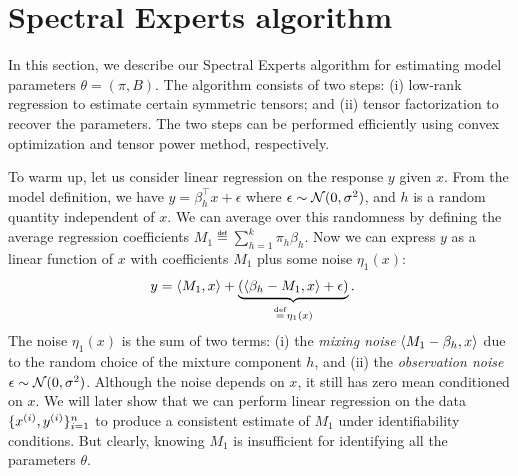 \section{Spectral Experts algorithm}
\label{sec:algo}

In this section, we describe our Spectral Experts algorithm
for estimating model parameters $\theta = (\pi, B)$.
The algorithm consists of two steps:
(i) low-rank regression to estimate certain symmetric tensors;
and (ii) tensor factorization to recover the parameters.
The two steps can be performed efficiently using
convex optimization and tensor power method, respectively.

To warm up, let us consider linear regression
on the response $y$ given $x$.
From the model definition, we have $y = \beta_h^\top x + \epsilon$ where
$\epsilon \sim \mathcal{N}(0, \sigma^2)$, and $h$ is a random quantity
independent of $x$.
We can average over this randomness by defining
the average regression coefficients
$M_1 \eqdef \sum_{h=1}^k \pi_h \beta_h$.
Now we can express $y$ as a linear function of $x$ with coefficients $M_1$
plus some noise $\eta_1(x)$:
\begin{align}
  y &= \langle M_1, x \rangle +
  \underbrace{(\langle \beta_h - M_1, x \rangle + \epsilon)}_{\stackrel{\rm def}{=} \eta_1(x)}. \label{eqn:y1}
\end{align}
The noise $\eta_1(x)$ is the sum of two terms:
(i) the \emph{mixing noise} $\langle M_1 - \beta_h, x \rangle$
due to the random choice of the mixture component $h$,
and (ii) the \emph{observation noise} $\epsilon \sim \mathcal{N}(0, \sigma^2)$.
Although the noise depends on $x$,
it still has zero mean conditioned on $x$.
We will later show that we can
perform linear regression on the data $\{x^{(i)},
y^{(i)}\}_{i=1}^{n}$ to produce a consistent estimate of $M_1$
under identifiability conditions.
But clearly, knowing $M_1$ is insufficient
for identifying all the parameters $\theta$.

